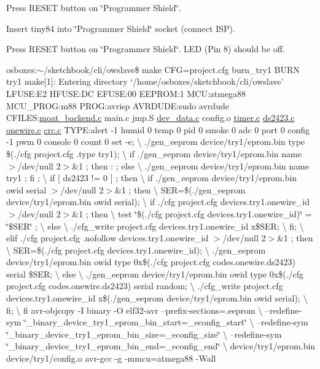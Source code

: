 Press R\-E\-S\-E\-T button on \char`\"{}\-Programmer Shield\char`\"{}.

Insert tiny84 into \char`\"{}\-Programmer Shield\char`\"{} socket (connect I\-S\-P).

Press R\-E\-S\-E\-T button on \char`\"{}\-Programmer Shield\char`\"{}. L\-E\-D (Pin 8) should be off.

osboxes\-:$\sim$/sketchbook/cli/owslave\$ make C\-F\-G=project.\-cfg burn\-\_\-try1 B\-U\-R\-N try1 make\mbox{[}1\mbox{]}\-: Entering directory `/home/osboxes/sketchbook/cli/owslave' L\-F\-U\-S\-E\-:E2 H\-F\-U\-S\-E\-:D\-C E\-F\-U\-S\-E\-:00 E\-E\-P\-R\-O\-M\-:1 M\-C\-U\-:atmega88 M\-C\-U\-\_\-\-P\-R\-O\-G\-:m88 P\-R\-O\-G\-:avrisp A\-V\-R\-D\-U\-D\-E\-:sudo avrdude C\-F\-I\-L\-E\-S\-:\hyperlink{moat__backend_8c}{moat\-\_\-backend.\-c} main.\-c jmp.\-S \hyperlink{dev__data_8c}{dev\-\_\-data.\-c} config.\-o \hyperlink{timer_8c}{timer.\-c} \hyperlink{ds2423_8c}{ds2423.\-c} \hyperlink{onewire_8c}{onewire.\-c} \hyperlink{crc_8c}{crc.\-c} T\-Y\-P\-E\-:alert -\/1 humid 0 temp 0 pid 0 smoke 0 adc 0 port 0 config -\/1 pwm 0 console 0 count 0 set -\/e; \textbackslash{} ./gen\-\_\-eeprom device/try1/eprom.\-bin type \$(./cfg project.\-cfg .type try1); \textbackslash{} if ./gen\-\_\-eeprom device/try1/eprom.\-bin name $>$/dev/null 2$>$\&1 ; then \-: ; else \textbackslash{} ./gen\-\_\-eeprom device/try1/eprom.\-bin name try1 ; fi ; \textbackslash{} if \mbox{[} ds2423 != 0 \mbox{]} ; then \textbackslash{} if ./gen\-\_\-eeprom device/try1/eprom.\-bin owid serial $>$/dev/null 2$>$\&1 ; then \textbackslash{} S\-E\-R=\$(./gen\-\_\-eeprom device/try1/eprom.\-bin owid serial); \textbackslash{} if ./cfg project.\-cfg devices.\-try1.\-onewire\-\_\-id $>$/dev/null 2$>$\&1 ; then \textbackslash{} test \char`\"{}\$(./cfg project.\-cfg devices.\-try1.\-onewire\-\_\-id)\char`\"{} = \char`\"{}\$\-S\-E\-R\char`\"{} ; \textbackslash{} else \textbackslash{} ./cfg\-\_\-write project.\-cfg devices.\-try1.\-onewire\-\_\-id x\$\-S\-E\-R; \textbackslash{} fi; \textbackslash{} elif ./cfg project.\-cfg .nofollow devices.\-try1.\-onewire\-\_\-id $>$/dev/null 2$>$\&1 ; then \textbackslash{} S\-E\-R=\$(./cfg project.\-cfg devices.\-try1.\-onewire\-\_\-id); \textbackslash{} ./gen\-\_\-eeprom device/try1/eprom.\-bin owid type 0x\$(./cfg project.\-cfg codes.\-onewire.\-ds2423) serial \$\-S\-E\-R; \textbackslash{} else \textbackslash{} ./gen\-\_\-eeprom device/try1/eprom.\-bin owid type 0x\$(./cfg project.\-cfg codes.\-onewire.\-ds2423) serial random; \textbackslash{} ./cfg\-\_\-write project.\-cfg devices.\-try1.\-onewire\-\_\-id x\$(./gen\-\_\-eeprom device/try1/eprom.\-bin owid serial); \textbackslash{} fi; \textbackslash{} fi avr-\/objcopy -\/\-I binary -\/\-O elf32-\/avr --prefix-\/sections=.eeprom \textbackslash{} --redefine-\/sym \char`\"{}\-\_\-binary\-\_\-device\-\_\-try1\-\_\-eprom\-\_\-bin\-\_\-start=\-\_\-econfig\-\_\-start\char`\"{} \textbackslash{} --redefine-\/sym \char`\"{}\-\_\-binary\-\_\-device\-\_\-try1\-\_\-eprom\-\_\-bin\-\_\-size=\-\_\-econfig\-\_\-size\char`\"{} \textbackslash{} --redefine-\/sym \char`\"{}\-\_\-binary\-\_\-device\-\_\-try1\-\_\-eprom\-\_\-bin\-\_\-end=\-\_\-econfig\-\_\-end\char`\"{} \textbackslash{} device/try1/eprom.\-bin device/try1/config.\-o avr-\/gcc -\/g -\/mmcu=atmega88 -\/\-Wall 